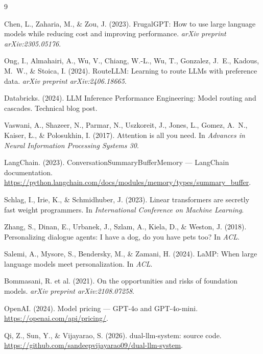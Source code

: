 \documentclass{article}
\begin{document}
\begin{thebibliography}{9}

Chen, L., Zaharia, M., \& Zou, J. (2023).
FrugalGPT: How to use large language models while reducing cost and
improving performance. \emph{arXiv preprint arXiv:2305.05176}.

Ong, I., Almahairi, A., Wu, V., Chiang, W.-L., Wu, T., Gonzalez, J.~E.,
Kadous, M.~W., \& Stoica, I. (2024).
RouteLLM: Learning to route LLMs with preference data.
\emph{arXiv preprint arXiv:2406.18665}.

Databricks. (2024).
LLM Inference Performance Engineering: Model routing and cascades.
Technical blog post.

Vaswani, A., Shazeer, N., Parmar, N., Uszkoreit, J., Jones, L., Gomez, A.~N.,
Kaiser, {\L}., \& Polosukhin, I. (2017).
Attention is all you need. In \emph{Advances in Neural Information Processing
Systems 30}.

LangChain. (2023).
ConversationSummaryBufferMemory --- LangChain documentation.
\url{https://python.langchain.com/docs/modules/memory/types/summary_buffer}.

Schlag, I., Irie, K., \& Schmidhuber, J. (2023).
Linear transformers are secretly fast weight programmers.
In \emph{International Conference on Machine Learning}.

Zhang, S., Dinan, E., Urbanek, J., Szlam, A., Kiela, D., \& Weston, J. (2018).
Personalizing dialogue agents: I have a dog, do you have pets too?
In \emph{ACL}.

Salemi, A., Mysore, S., Bendersky, M., \& Zamani, H. (2024).
LaMP: When large language models meet personalization.
In \emph{ACL}.

Bommasani, R. et al. (2021).
On the opportunities and risks of foundation models.
\emph{arXiv preprint arXiv:2108.07258}.

OpenAI. (2024).
Model pricing --- GPT-4o and GPT-4o-mini.
\url{https://openai.com/api/pricing/}.

Qi, Z., Sun, Y., \& Vijayarao, S. (2026).
dual-llm-system: source code.
\url{https://github.com/sandeepvijayarao09/dual-llm-system}.

\end{thebibliography}
\end{document}
